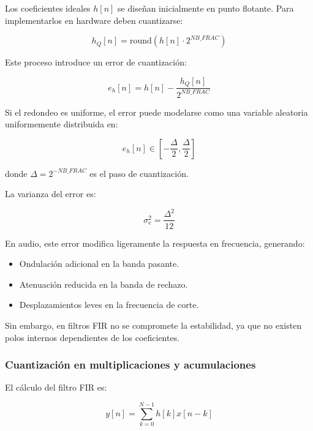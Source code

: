 \documentclass[a4,11pt]{article}
\begin{document}
Los coeficientes ideales $h[n]$ se diseñan inicialmente en punto flotante. Para implementarlos en hardware deben cuantizarse:

\begin{equation}
\label{eq:cuantizacion_coef}
h_Q[n] = \mathrm{round}\left(h[n] \cdot 2^{NB\_FRAC}\right)
\end{equation}

Este proceso introduce un error de cuantización:

\begin{equation}
\label{eq:error_cuantizacion}
e_h[n] = h[n] - \frac{h_Q[n]}{2^{NB\_FRAC}}
\end{equation}

Si el redondeo es uniforme, el error puede modelarse como una variable aleatoria uniformemente distribuida en:

\begin{equation}
\label{eq:rango_error}
e_h[n] \in \left[-\frac{\Delta}{2}, \frac{\Delta}{2}\right]
\end{equation}

donde $\Delta = 2^{-NB\_FRAC}$ es el paso de cuantización.

La varianza del error es:

\begin{equation}
\label{eq:varianza_error}
\sigma_e^2 = \frac{\Delta^2}{12}
\end{equation}

En audio, este error modifica ligeramente la respuesta en frecuencia, generando:

\begin{itemize}
\item Ondulación adicional en la banda pasante.
\item Atenuación reducida en la banda de rechazo.
\item Desplazamientos leves en la frecuencia de corte.
\end{itemize}

Sin embargo, en filtros FIR no se compromete la estabilidad, ya que no existen polos internos dependientes de los coeficientes.

\subsubsection{Cuantización en multiplicaciones y acumulaciones}
\label{subsubsec:cuantizacion_mac}

El cálculo del filtro FIR es:

\begin{equation}
\label{eq:fir_conv}
y[n] = \sum_{k=0}^{N-1} h[k] x[n-k]
\end{equation}
\end{document}
